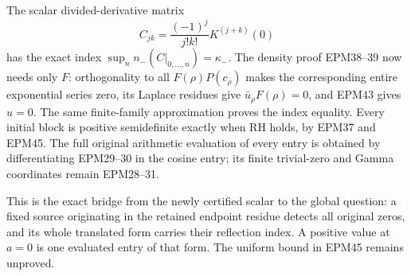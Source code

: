 \documentclass[
  10pt,
  a4paper,
]{article}
\begin{document}
The scalar divided-derivative matrix \[
C_{jk}=\frac{(-1)^j}{j!k!}K^{(j+k)}(0)
\tag{EPM47}
\] has the exact index \(\sup_n n_-(C|_{0,\ldots,n})=\kappa_-\). The
density proof EPM38--39 now needs only \(F\): orthogonality to all
\(F(\rho)P(c_\rho)\) makes the corresponding entire exponential series
zero, its Laplace residues give \(\bar u_\rho F(\rho)=0\), and EPM43
gives \(u=0\). The same finite-family approximation proves the index
equality. Every initial block is positive semidefinite exactly when RH
holds, by EPM37 and EPM45. The full original arithmetic evaluation of
every entry is obtained by differentiating EPM29--30 in the cosine
entry; its finite trivial-zero and Gamma coordinates remain EPM28--31.

This is the exact bridge from the newly certified scalar to the global
question: a fixed source originating in the retained endpoint residue
detects all original zeros, and its whole translated form carries their
reflection index. A positive value at \(a=0\) is one evaluated entry of
that form. The uniform bound in EPM45 remains unproved.
\end{document}
